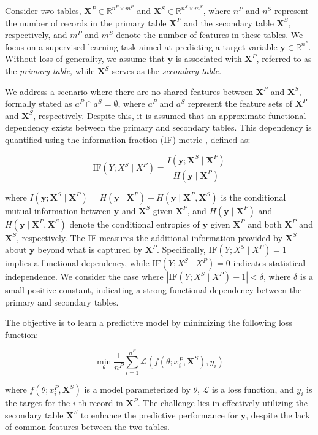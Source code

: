 Consider two tables, \(\mathbf{X}^P \in \mathbb{R}^{n^P \times m^P}\) and \(\mathbf{X}^S \in \mathbb{R}^{n^S \times m^S}\), where \(n^P\) and \(n^S\) represent the number of records in the primary table \(\mathbf{X}^P\) and the secondary table \(\mathbf{X}^S\), respectively, and \(m^P\) and \(m^S\) denote the number of features in these tables. We focus on a supervised learning task aimed at predicting a target variable \(\mathbf{y} \in \mathbb{R}^{n^P}\). Without loss of generality, we assume that \(\mathbf{y}\) is associated with \(\mathbf{X}^P\), referred to as the \textit{primary table}, while \(\mathbf{X}^S\) serves as the \textit{secondary table}.


We address a scenario where there are no shared features between \(\mathbf{X}^P\) and \(\mathbf{X}^S\), formally stated as \(a^P \cap a^S = \emptyset\), where \(a^P\) and \(a^S\) represent the feature sets of \(\mathbf{X}^P\) and \(\mathbf{X}^S\), respectively. Despite this, it is assumed that an approximate functional dependency \cite{mandros2017discovering} exists between the primary and secondary tables. This dependency is quantified using the information fraction (IF) metric \cite{reimherr2013quantifying}, defined as:

\[
\text{IF}(Y; X^S \mid X^P) = \frac{I(\mathbf{y}; \mathbf{X}^S \mid \mathbf{X}^P)}{H(\mathbf{y} \mid \mathbf{X}^P)}
\]

where \(I(\mathbf{y}; \mathbf{X}^S \mid \mathbf{X}^P) = H(\mathbf{y} \mid \mathbf{X}^P) - H(\mathbf{y} \mid \mathbf{X}^P, \mathbf{X}^S)\) is the conditional mutual information between \(\mathbf{y}\) and \(\mathbf{X}^S\) given \(\mathbf{X}^P\), and \(H(\mathbf{y} \mid \mathbf{X}^P)\) and \(H(\mathbf{y} \mid \mathbf{X}^P, \mathbf{X}^S)\) denote the conditional entropies of \(\mathbf{y}\) given \(\mathbf{X}^P\) and both \(\mathbf{X}^P\) and \(\mathbf{X}^S\), respectively. The IF measures the additional information provided by \(\mathbf{X}^S\) about \(\mathbf{y}\) beyond what is captured by \(\mathbf{X}^P\). Specifically, \(\text{IF}(Y; X^S \mid X^P) = 1\) implies a functional dependency, while \(\text{IF}(Y; X^S \mid X^P) = 0\) indicates statistical independence. We consider the case where \(|\text{IF}(Y; X^S \mid X^P) - 1|<\delta\), where \(\delta\) is a small positive constant, indicating a strong functional dependency between the primary and secondary tables.

The objective is to learn a predictive model by minimizing the following loss function:

\[
\min_{\theta} \frac{1}{n^P} \sum_{i=1}^{n^P} \mathcal{L}\left(f(\theta; x_i^P, \mathbf{X}^S), y_i\right)
\]

where \(f(\theta; x_i^P, \mathbf{X}^S)\) is a model parameterized by \(\theta\), \(\mathcal{L}\) is a loss function, and \(y_i\) is the target for the \(i\)-th record in \(\mathbf{X}^P\). The challenge lies in effectively utilizing the secondary table \(\mathbf{X}^S\) to enhance the predictive performance for \(\mathbf{y}\), despite the lack of common features between the two tables.
